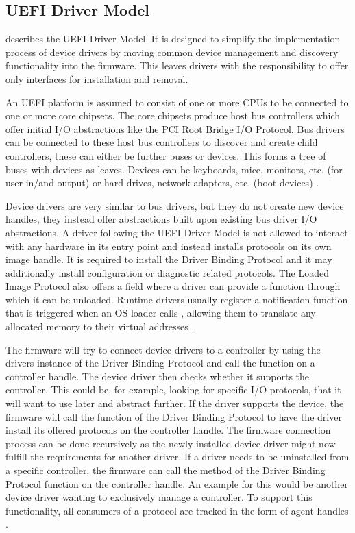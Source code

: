 \subsection{\acs{UEFI} Driver Model}

\cite[Section 2.5]{uefi-spec} describes the \acs{UEFI} Driver Model.
It is designed to simplify the implementation process of device drivers by moving common device management and discovery functionality into the firmware.
This leaves drivers with the responsibility to offer only interfaces for installation and removal.

An \ac{UEFI} platform is assumed to consist of one or more \acp{CPU} to be connected to one or more core chipsets.
The core chipsets produce host bus controllers which offer initial \ac{I/O} abstractions like the \ac{PCI} Root Bridge \ac{I/O} Protocol.
Bus drivers can be connected to these host bus controllers to discover and create child controllers, these can either be further buses or devices.
This forms a tree of buses with devices as leaves.
Devices can be keyboards, mice, monitors, etc. (for user in\-/and output) or hard drives, network adapters, etc. (boot devices) \cite[Section 2.5]{uefi-spec}.

Device drivers are very similar to bus drivers, but they do not create new device handles, they instead offer abstractions built upon existing bus driver \ac{I/O} abstractions.
A driver following the \ac{UEFI} Driver Model is not allowed to interact with any hardware in its entry point and instead installs protocols on its own image handle.
It is required to install the Driver Binding Protocol and it may additionally install configuration or diagnostic related protocols.
The Loaded Image Protocol also offers a field where a driver can provide a function through which it can be unloaded.
Runtime drivers usually register a notification function that is triggered when an \ac{OS} loader calls , allowing them to translate any allocated memory to their virtual addresses \cite[Section 2.5.2]{uefi-spec}.

The firmware will try to connect device drivers to a controller by using the drivers instance of the Driver Binding Protocol and call the  function on a controller handle.
The device driver then checks whether it supports the controller.
This could be, for example, looking for specific \ac{I/O} protocols, that it will want to use later and abstract further.
If the driver supports the device, the firmware will call the  function of the Driver Binding Protocol to have the driver install its offered protocols on the controller handle.
The firmware connection process can be done recursively as the newly installed device driver might now fulfill the requirements for another driver.
If a driver needs to be uninstalled from a specific controller, the firmware can call the  method of the Driver Binding Protocol function on the controller handle.
An example for this would be another device driver wanting to exclusively manage a controller.
To support this functionality, all consumers of a protocol are tracked in the form of agent handles \cite[Section 2.5.4]{uefi-spec}.

